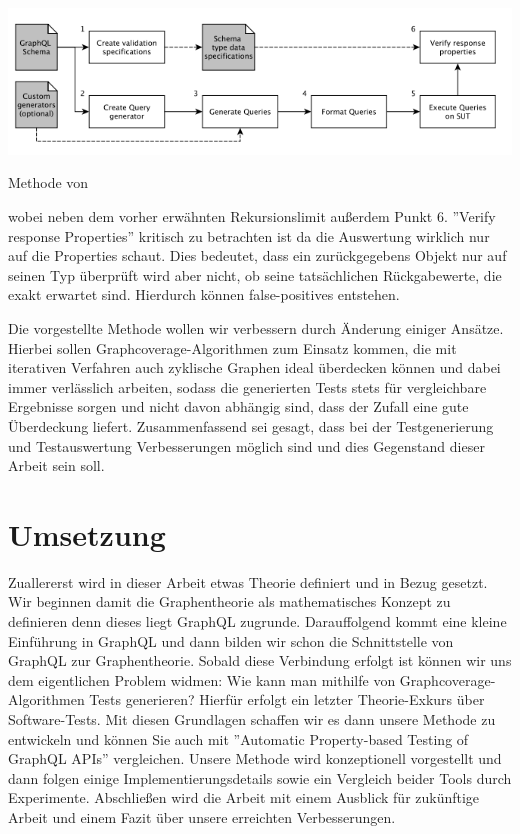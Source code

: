 \begin{center}
    \includegraphics[width=\textwidth,height=\textheight,keepaspectratio]{content/einleitung/toolchain}
    \caption{Methode von~\cite{property-based-testing}}
\end{center}

wobei neben dem vorher erwähnten Rekursionslimit außerdem Punkt 6. ''Verify response Properties'' kritisch
zu betrachten ist da die Auswertung wirklich nur auf die Properties schaut.
Dies bedeutet, dass ein zurückgegebens Objekt nur auf seinen Typ überprüft wird aber nicht, ob seine tatsächlichen Rückgabewerte, die exakt erwartet sind.
Hierdurch können false-positives entstehen.

Die vorgestellte Methode wollen wir verbessern durch Änderung einiger Ansätze.
Hierbei sollen Graphcoverage-Algorithmen zum Einsatz kommen, die mit iterativen Verfahren auch zyklische Graphen ideal
überdecken können und dabei immer verlässlich arbeiten, sodass die generierten Tests stets für vergleichbare Ergebnisse sorgen und nicht
davon abhängig sind, dass der Zufall eine gute Überdeckung liefert.
Zusammenfassend sei gesagt, dass bei der Testgenerierung und Testauswertung Verbesserungen möglich sind und dies Gegenstand dieser Arbeit sein soll.

\section{Umsetzung}

Zuallererst wird in dieser Arbeit etwas Theorie definiert und in Bezug gesetzt.
Wir beginnen damit die Graphentheorie als mathematisches Konzept zu definieren denn dieses liegt GraphQL zugrunde.
Darauffolgend kommt eine kleine Einführung in GraphQL und dann bilden wir schon die Schnittstelle von GraphQL zur Graphentheorie.
Sobald diese Verbindung erfolgt ist können wir uns dem eigentlichen Problem widmen: Wie kann man mithilfe von Graphcoverage-Algorithmen
Tests generieren?
Hierfür erfolgt ein letzter Theorie-Exkurs über Software-Tests.
Mit diesen Grundlagen schaffen wir es dann unsere Methode zu entwickeln und können Sie auch mit ''Automatic Property-based Testing of GraphQL APIs''\cite{property-based-testing}
vergleichen.
Unsere Methode wird konzeptionell vorgestellt und dann folgen einige Implementierungsdetails sowie ein Vergleich beider Tools durch Experimente.
Abschließen wird die Arbeit mit einem Ausblick für zukünftige Arbeit und einem Fazit über unsere erreichten Verbesserungen.